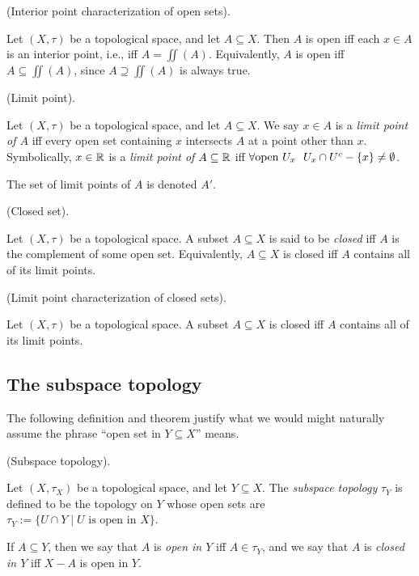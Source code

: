 \begin{defn}
    (Interior point characterization of open sets).
    
    Let $(X, \tau)$ be a topological space, and let $A \subseteq X$. Then $A$ is open iff each $x \in A$ is an interior point, i.e., iff $A = \iint(A)$. Equivalently, $A$ is open iff $A \subseteq \iint(A)$, since $A \supseteq \iint(A)$ is always true.
\end{defn}


\begin{defn}
    (Limit point).
    
    Let $(X, \tau)$ be a topological space, and let $A \subseteq X$. We say $x \in A$ is a \textit{limit point of $A$} iff every open set containing $x$ intersects $A$ at a point other than $x$. Symbolically, $x \in \mathbb{R}$ is a \textit{limit point of $A \subseteq \mathbb{R}$} iff  ${\forall \text{open } U_x \text{ } \text{ } U_x \cap U^c - \{x\} \neq \emptyset}$.
    
    The set of limit points of $A$ is denoted $A'$.
\end{defn}

\begin{defn}
    (Closed set).
    
    Let $(X, \tau)$ be a topological space. A subset $A \subseteq X$ is said to be \textit{closed} iff $A$ is the complement of some open set. Equivalently, $A \subseteq X$ is closed iff $A$ contains all of its limit points.
\end{defn}

\begin{theorem}
    (Limit point characterization of closed sets).
    
    Let $(X, \tau)$ be a topological space. A subset $A \subseteq X$ is closed iff $A$ contains all of its limit points.
\end{theorem}

\subsection*{The subspace topology}

The following definition and theorem justify what we would might naturally assume the phrase ``open set in $Y \subseteq X$'' means.

\begin{defn}
    (Subspace topology).
    
    Let $(X, \tau_X)$ be a topological space, and let $Y \subseteq X$. The \textit{subspace topology} $\tau_Y$ is defined to be the topology on $Y$ whose open sets are $\tau_Y := \{U \cap Y \mid \text{$U$ is open in $X$}\}$.

    If $A \subseteq Y$, then we say that $A$ is \textit{open in $Y$} iff $A \in \tau_Y$, and we say that $A$ is \textit{closed in $Y$} iff $X - A$ is open in $Y$.
\end{defn}

